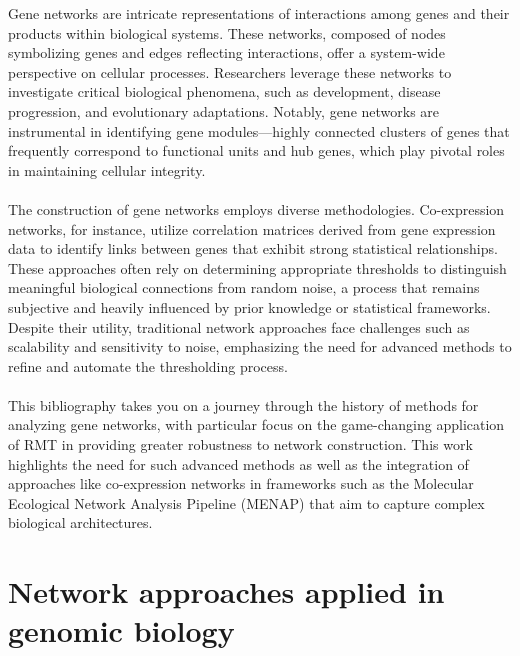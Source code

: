 \documentclass{article}[12pt]
\begin{document}
Gene networks are intricate representations of interactions among genes and their products within biological systems\supercite{oldham_conservation_2006}.
These networks, composed of nodes symbolizing genes and edges reflecting interactions\supercite{barabasi_network_2004}, offer a system-wide perspective on cellular processes.
Researchers leverage these networks to investigate critical biological phenomena\supercite{barabasi_network_2004}, such as development\supercite{montoya_ecological_2006}, disease progression\supercite{friedman_using_2000}, and evolutionary adaptations\supercite{dunne_food-web_2002}.
Notably, gene networks are instrumental in identifying gene modules—highly connected clusters of genes that frequently correspond to functional units and hub genes, which play pivotal roles in maintaining cellular integrity\supercite{zhang_general_2005}.
\\\\
The construction of gene networks employs diverse methodologies.
Co-expression networks, for instance, utilize correlation matrices derived from gene expression data to identify links between genes that exhibit strong statistical relationships\supercite{zhang_general_2005}.
These approaches often rely on determining appropriate thresholds to distinguish meaningful biological connections from random noise, a process that remains subjective and heavily influenced by prior knowledge or statistical frameworks.
Despite their utility, traditional network approaches face challenges such as scalability and sensitivity to noise, emphasizing the need for advanced methods to refine and automate the thresholding process\supercite{deng_molecular_2012}.
\\\\

This bibliography takes you on a journey through the history of methods for analyzing gene networks, with particular focus on the game-changing application of RMT in providing greater robustness to network construction.
This work highlights the need for such advanced methods as well as the integration of approaches like co-expression networks in frameworks such as the Molecular Ecological Network Analysis Pipeline (MENAP) that aim to capture complex biological architectures.


\section{Network approaches applied in genomic biology}\label{sec:network-approaches-applied-in-genomic-biology}

\end{document}
